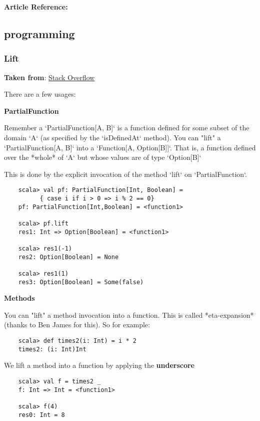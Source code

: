\documentclass{article}
\begin{document}
\textbf{Article Reference:} \cite{2011arXiv1109.4850P}

\subsection{programming}

\subsubsection{Lift}

\textbf{Taken from}: \href{http://stackoverflow.com/questions/17965059/what-is-lifting-in-scala}{Stack Overflow}

There are a few usages:

\textbf{PartialFunction}


Remember a `PartialFunction[A, B]` is a function defined for some subset of the domain `A` (as specified by the `isDefinedAt` method). You can "lift" a `PartialFunction[A, B]` into a `Function[A, Option[B]]`. That is, a function defined over the *whole* of `A` but whose values are of type `Option[B]`

This is done by the explicit invocation of the method `lift` on `PartialFunction`.

\begin{verbatim}
    scala> val pf: PartialFunction[Int, Boolean] = 
          { case i if i > 0 => i % 2 == 0}
    pf: PartialFunction[Int,Boolean] = <function1>

    scala> pf.lift
    res1: Int => Option[Boolean] = <function1>

    scala> res1(-1)
    res2: Option[Boolean] = None

    scala> res1(1)
    res3: Option[Boolean] = Some(false)
\end{verbatim}

\textbf{Methods}

You can "lift" a method invocation into a function. This is called *eta-expansion* (thanks to Ben James for this). So for example:

\begin{verbatim}
    scala> def times2(i: Int) = i * 2
    times2: (i: Int)Int
\end{verbatim}

We lift a method into a function by applying the \textbf{underscore}

\begin{verbatim}
    scala> val f = times2 _
    f: Int => Int = <function1>

    scala> f(4)
    res0: Int = 8
\end{verbatim}
\end{document}
